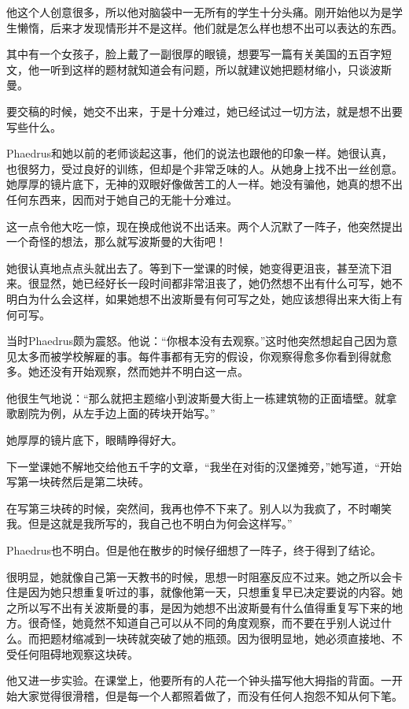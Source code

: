 \documentclass[UTF8]{article}
\begin{document}
\par 他这个人创意很多，所以他对脑袋中一无所有的学生十分头痛。刚开始他以为是学生懒惰，后来才发现情形并不是这样。他们就是怎么样也想不出可以表达的东西。
\par 其中有一个女孩子，脸上戴了一副很厚的眼镜，想要写一篇有关美国的五百字短文，他一听到这样的题材就知道会有问题，所以就建议她把题材缩小，只谈波斯曼。
\par 要交稿的时候，她交不出来，于是十分难过，她已经试过一切方法，就是想不出要写些什么。
\par Phaedrus和她以前的老师谈起这事，他们的说法也跟他的印象一样。她很认真，也很努力，受过良好的训练，但却是个非常乏味的人。从她身上找不出一丝创意。她厚厚的镜片底下，无神的双眼好像做苦工的人一样。她没有骗他，她真的想不出任何东西来，因而对于她自己的无能十分难过。
\par 这一点令他大吃一惊，现在换成他说不出话来。两个人沉默了一阵子，他突然提出一个奇怪的想法，那么就写波斯曼的大街吧！
\par 她很认真地点点头就出去了。等到下一堂课的时候，她变得更沮丧，甚至流下泪来。很显然，她已经好长一段时间都非常沮丧了，她仍然想不出有什么可写，她不明白为什么会这样，如果她想不出波斯曼有何可写之处，她应该想得出来大街上有何可写。
\par 当时Phaedrus颇为震怒。他说：“你根本没有去观察。”这时他突然想起自己因为意见太多而被学校解雇的事。每件事都有无穷的假设，你观察得愈多你看到得就愈多。她还没有开始观察，然而她并不明白这一点。
\par 他很生气地说：“那么就把主题缩小到波斯曼大街上一栋建筑物的正面墙壁。就拿歌剧院为例，从左手边上面的砖块开始写。”
\par 她厚厚的镜片底下，眼睛睁得好大。
\par 下一堂课她不解地交给他五千字的文章，“我坐在对街的汉堡摊旁，”她写道，“开始写第一块砖然后是第二块砖。
\par 在写第三块砖的时候，突然间，我再也停不下来了。别人以为我疯了，不时嘲笑我。但是这就是我所写的，我自己也不明白为何会这样写。”
\par Phaedrus也不明白。但是他在散步的时候仔细想了一阵子，终于得到了结论。
\par 很明显，她就像自己第一天教书的时候，思想一时阻塞反应不过来。她之所以会卡住是因为她只想重复听过的事，就像他第一天，只想重复早已决定要说的内容。她之所以写不出有关波斯曼的事，是因为她想不出波斯曼有什么值得重复写下来的地方。很奇怪，她竟然不知道自己可以从不同的角度观察，而不要在乎别人说过什么。而把题材缩减到一块砖就突破了她的瓶颈。因为很明显地，她必须直接地、不受任何阻碍地观察这块砖。
\par 他又进一步实验。在课堂上，他要所有的人花一个钟头描写他大拇指的背面。一开始大家觉得很滑稽，但是每一个人都照着做了，而没有任何人抱怨不知从何下笔。
\end{document}
